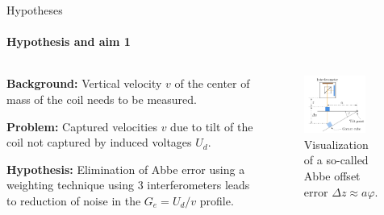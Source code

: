 \documentclass{beamer}
\begin{document}
\begin{frame}[allowframebreaks]{Hypotheses}
  \framesubtitle{Hypothesis and aim 1}

  \begin{columns}
    \begin{column}{0.59\textwidth}
\textbf{Background:} Vertical velocity $v$ of the center of mass of the coil needs to be measured.
    
    \textbf{Problem:} Captured velocities $v$ due to tilt of the coil not captured by induced voltages $U_d$.

    \textbf{Hypothesis:} Elimination of Abbe error using a weighting technique using 3 interferometers leads to reduction of noise in the $G_e = U_d/v$ profile.
    \end{column}
    
    \begin{column}{0.4\textwidth}
      \begin{figure}[h!] 
	\centering
	\includegraphics[width=0.8\textwidth]{figures/abbeerror.pdf}
	\caption{Visualization of a so-called Abbe offset error $\Delta z \approx a \varphi$.}
	\label{fig:abbeerror}
      \end{figure}
    \end{column}
  \end{columns}
\end{frame}
\end{document}
